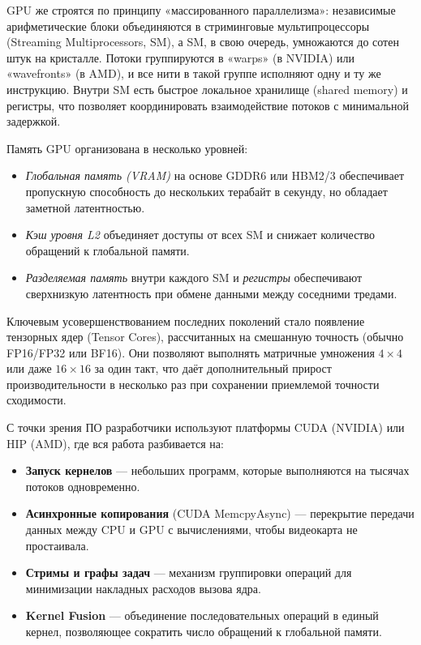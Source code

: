 GPU же строятся по принципу «массированного параллелизма»: независимые арифметические блоки объединяются в стриминговые мультипроцессоры (Streaming Multiprocessors, SM), а SM, в свою очередь, умножаются до сотен штук на кристалле. Потоки группируются в «warps» (в NVIDIA) или «wavefronts» (в AMD), и все нити в такой группе исполняют одну и ту же инструкцию. Внутри SM есть быстрое локальное хранилище (shared memory) и регистры, что позволяет координировать взаимодействие потоков с минимальной задержкой.  

Память GPU организована в несколько уровней:  
\begin{itemize}  
  \item \emph{Глобальная память (VRAM)} на основе GDDR6 или HBM2/3 обеспечивает пропускную способность до нескольких терабайт в секунду, но обладает заметной латентностью.  
  \item \emph{Кэш уровня L2} объединяет доступы от всех SM и снижает количество обращений к глобальной памяти.  
  \item \emph{Разделяемая память} внутри каждого SM и \emph{регистры} обеспечивают сверхнизкую латентность при обмене данными между соседними тредами.  
\end{itemize}  

Ключевым усовершенствованием последних поколений стало появление тензорных ядер (Tensor Cores), рассчитанных на смешанную точность (обычно FP16/FP32 или BF16). Они позволяют выполнять матричные умножения $4\times4$ или даже $16\times16$ за один такт, что даёт дополнительный прирост производительности в несколько раз при сохранении приемлемой точности сходимости.  

С точки зрения ПО разработчики используют платформы CUDA (NVIDIA) или HIP (AMD), где вся работа разбивается на:  
\begin{itemize}  
  \item \textbf{Запуск кернелов} — небольших программ, которые выполняются на тысячах потоков одновременно.  
  \item \textbf{Асинхронные копирования} (CUDA MemcpyAsync) — перекрытие передачи данных между CPU и GPU с вычислениями, чтобы видеокарта не простаивала.  
  \item \textbf{Стримы и графы задач} — механизм группировки операций для минимизации накладных расходов вызова ядра.  
  \item \textbf{Kernel Fusion} — объединение последовательных операций в единый кернел, позволяющее сократить число обращений к глобальной памяти.  
\end{itemize}  

